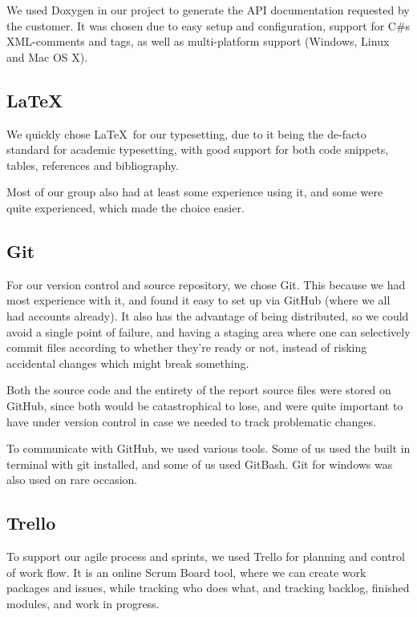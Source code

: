 We used Doxygen in our project to generate the API documentation requested by the customer. It was chosen due to easy setup and configuration, support for C\#s XML-comments and tags, as well as multi-platform support (Windows, Linux and Mac OS X).

\subsection{\LaTeX}
We quickly chose \LaTeX \ for our typesetting, due to it being the de-facto standard for academic typesetting, with good support for both code snippets, tables, references and bibliography.

Most of our group also had at least some experience using it, and some were quite experienced, which made the choice easier.

\subsection{Git}
For our version control and source repository, we chose Git. This because we had most experience with it, and found it easy to set up via GitHub (where we all had accounts already). It also has the advantage of being distributed, so we could avoid a single point of failure, and having a staging area where one can selectively commit files according to whether they're ready or not, instead of risking accidental changes which might break something.

Both the source code and the entirety of the report source files were stored on GitHub, since both would be catastrophical to lose, and were quite important to have under version control in case we needed to track problematic changes.

To communicate with GitHub, we used various tools. Some of us used the built in terminal with git installed, and some of us used GitBash. Git for windows was also used on rare occasion.

\subsection{Trello}\label{Trello}
To support our agile process and sprints, we used Trello for planning and control of work flow. It is an online Scrum Board tool, where we can create work packages and issues, while tracking who does what, and tracking backlog, finished modules, and work in progress.

